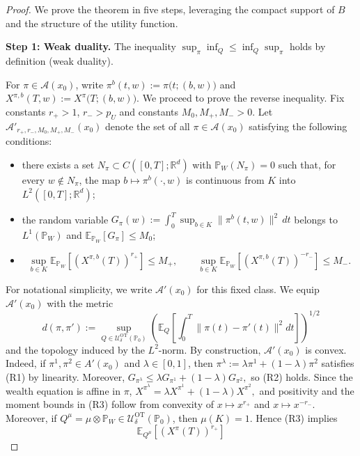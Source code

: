 \documentclass[11pt]{article}
\theoremstyle{definition}
\begin{document}
\begin{proof}
We prove the theorem in five steps, leveraging the compact support of $B$ and the structure of the utility function.

\textbf{Step 1: Weak duality.} The inequality $\sup_\pi \inf_{Q} \leq \inf_{Q} \sup_\pi$ holds by definition (weak duality). {For $\pi\in \mathcal{A}(x_0)$, write $\pi^b(t,w):=\pi\bigl(t;(b,w)\bigr)$ and $X^{\pi,b}(T,w):=X^\pi\bigl(T;(b,w)\bigr).$ 
We proceed to prove the reverse inequality. 
Fix constants \(r_+>1\), \(r_->p_U\) and constants %
\(M_0,M_+,M_->0\). %
Let 
\(
\mathcal{A}'_{r_+,r_-,M_0,M_+,M_-}(x_0)
\) 
denote the set of all \(\pi\in \mathcal{A}(x_0)\) satisfying the following conditions: %
\begin{itemize}
    \item[(R1)] there exists a set $N_\pi\subset C([0,T];\mathbb R^d)$ with
    $\mathbb P_W(N_\pi)=0$ such that, for every $w\notin N_\pi$, the map $b\longmapsto \pi^b(\cdot,w)$
    is continuous from $K$ into $L^2([0,T];\mathbb R^d)$;
    \item[(R2)] the random variable $G_\pi(w):=\int_0^T \sup_{b\in K}\|\pi^b(t,w)\|^2\,dt$
    belongs to $L^1(\mathbb P_W)$ and $\mathbb E_{\mathbb P_W}[G_\pi]\le M_0$; %
    \item[(R3)] %
    \[
    \sup_{b\in K}\mathbb E_{\mathbb P_W}\!\left[(X^{\pi,b}(T))^{r_+}\right]\le M_+,
    \qquad
    \sup_{b\in K}\mathbb E_{\mathbb P_W}\!\left[(X^{\pi,b}(T))^{-r_-}\right]\le M_-.
    \]
\end{itemize}
{For notational simplicity, we write \(\mathcal{A}'(x_0)\) for this fixed class.} 
We equip $\mathcal{A}'(x_0)$ with the metric
\[
d(\pi,\pi') := \sup_{{Q} \in \mathcal{U}^{\text{OT}}_{\delta}(\mathbb{P}_0)}\left( \mathbb{E}_{Q} \left[  \int_0^T \|\pi(t) - \pi'(t)\|^2 dt \right]\right)^{1/2}
\] and the topology induced by the $L^2$-norm.
By construction, $\mathcal{A}'(x_0)$ is convex. 
{Indeed, if \(\pi^1,\pi^2\in A'(x_0)\) and \(\lambda\in[0,1]\), then
\(
\pi^\lambda:=\lambda\pi^1+(1-\lambda)\pi^2
\)
satisfies (R1) by linearity. Moreover,
\(
G_{\pi^\lambda}\le \lambda G_{\pi^1}+(1-\lambda)G_{\pi^2},
\) 
so (R2) holds. Since the wealth equation is affine in \(\pi\), 
\(
X^{\pi^\lambda}
=
\lambda X^{\pi^1}+(1-\lambda)X^{\pi^2},
\) 
and positivity and the moment bounds in (R3) follow from convexity of
\(x\mapsto x^{r_+}\) and \(x\mapsto x^{-r_-}\).} 
Moreover, if ${Q}^\mu =\mu\otimes\mathbb P_W\in \mathcal{U}^{\text{OT}}_{\delta}  (\mathbb P_0)$, then $\mu(K)=1$.  Hence (R3) implies
\[
\mathbb E_{{Q}^\mu}\!\left[(X^\pi(T))^{r_+}\right]
\]}
\end{proof}
\end{document}
